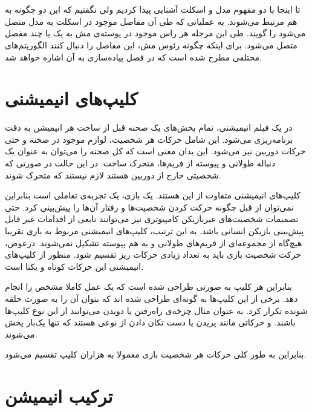 \section{
}

تا اینجا با دو مفهوم مدل و اسکلت آشنایی پیدا کردیم ولی نگفتیم که این دو چگونه به هم مرتبط می‌شوند.
به عملیاتی که طی آن مفاصل موجود در اسکلت به مدل متصل می‌شود را 
گویند.
طی این مرحله هر راس موجود در پوسته‌ی مش به یک یا چند مفصل متصل می‌شود.
برای اینکه چگونه رئوس مش، این مفاصل را دنبال کنند الگوریتم‌های مختلفی مطرح شده است که در فصل پیاده‌سازی به آن اشاره ‌خواهد شد.

\section{‌کلیپ‌های انیمیشنی}

در یک فیلم انیمیشنی، تمام بخش‌های یک صحنه قبل از ساخت هر انیمیشن به دقت برنامه‌ریزی می‌شود.
این شامل حرکات هر شخصیت، لوازم موجود در صحنه و حتی حرکات دوربین نیز می‌شود.
این بدان معنی است که کل صحنه را می‌توان به عنوان یک دنباله طولانی و پیوسته از فریم‌ها، متحرک ساخت.
در این حالت در صورتی که شخصیتی خارج از دوربین هستند لازم نیستند که متحرک شوند.

کلیپ‌های انیمیشنی متفاوت از این هستند. یک بازی، یک تجربه‌ی تعاملی است بنابراین نمی‌توان از قبل چگونه حرکت کردن شخصیت‌ها و رفتار آن‌ها را پیش‌بینی کرد.
حتی تصمیمات شخصیت‌های غیربازیکن کامپیوتری نیز می‌توانند تابعی از اقدامات غیر قابل پیش‌بینی بازیکن انسانی باشد.
به این ترتیب، کلیپ‌های انیمیشنی مربوط به بازی تقریبا هیچ‌گاه از مجموعه‌ای از فریم‌های طولانی و به هم پیوسته تشکیل نمی‌شوند.
درعوض، حرکت شخصیت بازی باید به تعداد زیادی حرکات ریز تقسیم شود. 
منظور از کلیپ‌های انیمیشنی این حرکات کوتاه و یکتا است.

بنابراین هر کلیپ به صورتی طراحی شده است که یک عمل کاملا مشخص را انجام دهد. برخی از این کلیپ‌ها به گونه‌ای طراحی شده اند که بتوان آن را به صورت حلقه شونده تکرار کرد.
به عنوان مثال چرخه‌ی راه‌رفتن یا دویدن می‌توانند از این نوع کلیپ‌ها باشند.
و حرکاتی مانند پریدن یا دست تکان دادن از نوعی هستند که تنها یک‌بار پخش می‌شوند.

بنابراین به طور کلی حرکات هر شخصیت بازی معمولا به هزاران کلیپ تقسیم می‌شود. \cite{GameEngineArchitecture}

\section{ترکیب انیمیشن}

